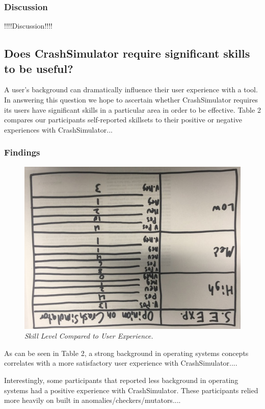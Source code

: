 \subsubsection{Discussion}

!!!!Discussion!!!!


\subsection{Does CrashSimulator require significant skills to be useful?}

A user's background can dramatically influence their user experience with a
tool.  In answering this question we hope to ascertain whether
CrashSimulator requires its users have significant skills in a particular
area in order to be effective.  Table 2 compares our participants
self-reported skillsets to their positive or negative experiences with
CrashSimulator...


\subsubsection{Findings}

\begin{figure}[t]
  \center{}
  \includegraphics[scale=.5]{images/table2}
  \caption{\emph{Skill Level Compared to User Experience.}}
  \label{fig-skill-exp}
\end{figure}

As can be seen in Table 2, a strong background in operating systems
concepts correlates with a more satisfactory user experience with
CrashSimulator....

Interestingly,  some participants that reported less background in
operating systems had a positive experience with CrashSimulator.  These
participants relied more heavily on built in
anomalies/checkers/mutators....


